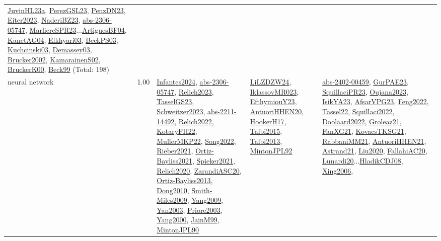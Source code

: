 {\begin{longtable}{p{3cm}r>{\raggedright\arraybackslash}p{6cm}>{\raggedright\arraybackslash}p{6cm}>{\raggedright\arraybackslash}p{8cm}}
\hyperref[detail:JuvinHL23a]{JuvinHL23a}, \hyperref[detail:PerezGSL23]{PerezGSL23}, \hyperref[detail:PenzDN23]{PenzDN23}, \hyperref[detail:Eiter2023]{Eiter2023}, \hyperref[detail:NaderiBZ23]{NaderiBZ23}, \hyperref[detail:abs-2306-05747]{abs-2306-05747}, \hyperref[detail:MarliereSPR23]{MarliereSPR23}...\hyperref[detail:ArtiguesBF04]{ArtiguesBF04}, \hyperref[detail:KanetAG04]{KanetAG04}, \hyperref[detail:Elkhyari03]{Elkhyari03}, \hyperref[detail:BeckPS03]{BeckPS03}, \hyperref[detail:Kuchcinski03]{Kuchcinski03}, \hyperref[detail:Demassey03]{Demassey03}, \hyperref[detail:Brucker2002]{Brucker2002}, \hyperref[detail:KamarainenS02]{KamarainenS02}, \hyperref[detail:BruckerK00]{BruckerK00}, \hyperref[detail:Beck99]{Beck99} (Total: 198)\\
\index{neural network}\index{Algorithms!neural network}neural network &  1.00 & \hyperref[detail:Infantes2024]{Infantes2024}, \hyperref[detail:abs-2306-05747]{abs-2306-05747}, \hyperref[detail:Relich2023]{Relich2023}, \hyperref[detail:TasselGS23]{TasselGS23}, \hyperref[detail:Schweitzer2023]{Schweitzer2023}, \hyperref[detail:abs-2211-14492]{abs-2211-14492}, \hyperref[detail:Relich2022]{Relich2022}, \hyperref[detail:KotaryFH22]{KotaryFH22}, \hyperref[detail:MullerMKP22]{MullerMKP22}, \hyperref[detail:Song2022]{Song2022}, \hyperref[detail:Rieber2021]{Rieber2021}, \hyperref[detail:Ortiz-Bayliss2021]{Ortiz-Bayliss2021}, \hyperref[detail:Spieker2021]{Spieker2021}, \hyperref[detail:Relich2020]{Relich2020}, \hyperref[detail:ZarandiASC20]{ZarandiASC20}, \hyperref[detail:Ortiz-Bayliss2013]{Ortiz-Bayliss2013}, \hyperref[detail:Dong2010]{Dong2010}, \hyperref[detail:Smith-Miles2009]{Smith-Miles2009}, \hyperref[detail:Yang2009]{Yang2009}, \hyperref[detail:Yan2003]{Yan2003}, \hyperref[detail:Priore2003]{Priore2003}, \hyperref[detail:Yang2000]{Yang2000}, \hyperref[detail:JainM99]{JainM99}, \hyperref[detail:MintonJPL90]{MintonJPL90} & \hyperref[detail:LiLZDZW24]{LiLZDZW24}, \hyperref[detail:IklassovMR023]{IklassovMR023}, \hyperref[detail:EfthymiouY23]{EfthymiouY23}, \hyperref[detail:AntuoriHHEN20]{AntuoriHHEN20}, \hyperref[detail:HookerH17]{HookerH17}, \hyperref[detail:Talbi2015]{Talbi2015}, \hyperref[detail:Talbi2013]{Talbi2013}, \hyperref[detail:MintonJPL92]{MintonJPL92} & \hyperref[detail:abs-2402-00459]{abs-2402-00459}, \hyperref[detail:GurPAE23]{GurPAE23}, \hyperref[detail:SquillaciPR23]{SquillaciPR23}, \hyperref[detail:Oujana2023]{Oujana2023}, \hyperref[detail:IsikYA23]{IsikYA23}, \hyperref[detail:AfsarVPG23]{AfsarVPG23}, \hyperref[detail:Feng2022]{Feng2022}, \hyperref[detail:Tassel22]{Tassel22}, \hyperref[detail:Squillaci2022]{Squillaci2022}, \hyperref[detail:Doolaard2022]{Doolaard2022}, \hyperref[detail:Groleaz21]{Groleaz21}, \hyperref[detail:FanXG21]{FanXG21}, \hyperref[detail:KovacsTKSG21]{KovacsTKSG21}, \hyperref[detail:RabbaniMM21]{RabbaniMM21}, \hyperref[detail:AntuoriHHEN21]{AntuoriHHEN21}, \hyperref[detail:Astrand21]{Astrand21}, \hyperref[detail:Liu2020]{Liu2020}, \hyperref[detail:FallahiAC20]{FallahiAC20}, \hyperref[detail:Lunardi20]{Lunardi20}...\hyperref[detail:HladikCDJ08]{HladikCDJ08}, \hyperref[detail:Xing2006]{Xing2006}, 
\end{longtable}}
